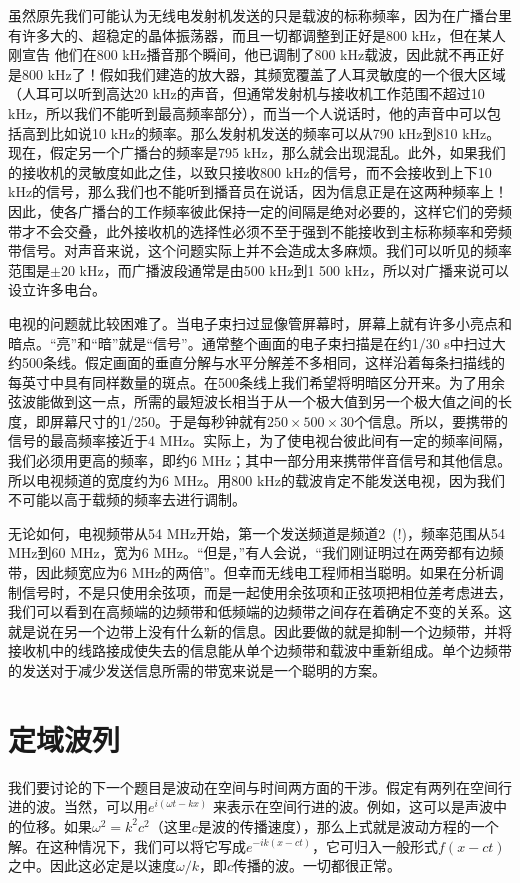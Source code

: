 虽然原先我们可能认为无线电发射机发送的只是载波的标称频率，因为在广播台里有许多大的、超稳定的晶体振荡器，而且一切都调整到正好是800 kHz，但在某人刚宣告 他们在800 kHz播音那个瞬间，他已调制了800 kHz载波，因此就不再正好是800 kHz了！假如我们建造的放大器，其频宽覆盖了人耳灵敏度的一个很大区域（人耳可以听到高达20 kHz的声音，但通常发射机与接收机工作范围不超过10 kHz，所以我们不能听到最高频率部分），而当一个人说话时，他的声音中可以包括高到比如说10 kHz的频率。那么发射机发送的频率可以从790 kHz到810 kHz。现在，假定另一个广播台的频率是795 kHz，那么就会出现混乱。此外，如果我们的接收机的灵敏度如此之佳，以致只接收800 kHz的信号，而不会接收到上下10 kHz的信号，那么我们也不能听到播音员在说话，因为信息正是在这两种频率上！因此，使各广播台的工作频率彼此保持一定的间隔是绝对必要的，这样它们的旁频带才不会交叠，此外接收机的选择性必须不至于强到不能接收到主标称频率和旁频带信号。对声音来说，这个问题实际上并不会造成太多麻烦。我们可以听见的频率范围是$\pm$20 kHz，而广播波段通常是由500 kHz到1 500 kHz，所以对广播来说可以设立许多电台。

电视的问题就比较困难了。当电子束扫过显像管屏幕时，屏幕上就有许多小亮点和暗点。“亮”和“暗”就是“信号”。通常整个画面的电子束扫描是在约1/30 s中扫过大约500条线。假定画面的垂直分解与水平分解差不多相同，这样沿着每条扫描线的每英寸中具有同样数量的斑点。在500条线上我们希望将明暗区分开来。为了用余弦波能做到这一点，所需的最短波长相当于从一个极大值到另一个极大值之间的长度，即屏幕尺寸的1/250。于是每秒钟就有$250\times 500\times 30$个信息。所以，要携带的信号的最高频率接近于4 MHz。实际上，为了使电视台彼此间有一定的频率间隔，我们必须用更高的频率，即约6 MHz；其中一部分用来携带伴音信号和其他信息。所以电视频道的宽度约为6 MHz。用800 kHz的载波肯定不能发送电视，因为我们不可能以高于载频的频率去进行调制。

无论如何，电视频带从54 MHz开始，第一个发送频道是频道2~(!)，频率范围从54 MHz到60 MHz，宽为6 MHz。“但是，”有人会说，“我们刚证明过在两旁都有边频带，因此频宽应为6 MHz的两倍”。但幸而无线电工程师相当聪明。如果在分析调制信号时，不是只使用余弦项，而是一起使用余弦项和正弦项把相位差考虑进去，我们可以看到在高频端的边频带和低频端的边频带之间存在着确定不变的关系。这就是说在另一个边带上没有什么新的信息。因此要做的就是抑制一个边频带，并将接收机中的线路接成使失去的信息能从单个边频带和载波中重新组成。单个边频带的发送对于减少发送信息所需的带宽来说是一个聪明的方案。

\section{定域波列}

我们要讨论的下一个题目是波动在空间与时间两方面的干涉。假定有两列在空间行进的波。当然，可以用$e^{i(\omega t - kx)}$ 来表示在空间行进的波。例如，这可以是声波中的位移。如果$\omega^2 =k^2 c^2$（这里$c$是波的传播速度），那么上式就是波动方程的一个解。在这种情况下，我们可以将它写成$e^{-ik(x - ct)}$，它可归入一般形式$f(x-ct)$之中。因此这必定是以速度$\omega/k$，即$c$传播的波。一切都很正常。

